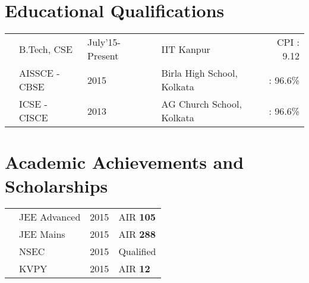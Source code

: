 \documentclass[11pt,a4paper]{moderncv}
\newcommand{\neducation}[5]{
  & #1 & #2 & &#5 & #3 : #4
}
\newcommand{\nachievement}[3]{
  & #1 & #2 & #3
}
\begin{document}
  \makecvtitle
  \section{Educational Qualifications}
  \begin{tabular}{L{0.05cm} L{6cm} l L{0.05cm} C{8cm} r}
      \neducation{B.Tech, CSE}{July'15-Present}{CPI}{9.12}{IIT Kanpur}\\
      \neducation{AISSCE - CBSE}{2015}{}{96.6\%}{Birla High School, Kolkata}\\
      \neducation{ICSE - CISCE}{2013}{}{96.6\%}{AG Church School, Kolkata}\\
    \end{tabular}
  \section{Academic Achievements and Scholarships}
  \begin{tabular}{L{0.05cm} L{6cm} C{8cm} l}
    \nachievement{JEE Advanced}{2015}{AIR \textbf{105}}\\
    \nachievement{JEE Mains}{2015}{AIR \textbf{288}}\\
    \nachievement{NSEC}{2015}{Qualified}\\
    \nachievement{KVPY}{2015}{AIR \textbf{12}}
  \end{tabular}
\end{document}
